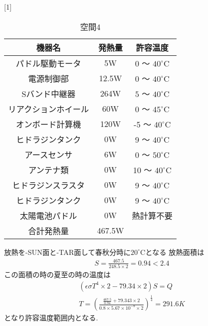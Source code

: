 \begin{table}[H]
  \begin{center}
  \caption{空間4}
  \scalebox{1}[1]{
  \begin{tabular}{|c|c|c|} \hline
    機器名 &  発熱量 & 許容温度 \\ \hline

  パドル駆動モータ
  & 5W
  & 0 〜 ${40}^\circ\mathrm{C}$\\

  電源制御部
  & 12.5W
  & 0 〜 ${40}^\circ\mathrm{C}$\\

  Sバンド中継器
  & 264W
  & $5$ 〜 ${40}^\circ\mathrm{C}$\\

  リアクションホイール
  & 60W
  & 0 〜 ${45}^\circ\mathrm{C}$\\

  オンボード計算機
  & 120W
  & -5 〜 ${40}^\circ\mathrm{C}$\\

  ヒドラジンタンク
  & 0W
  & 9 〜 ${40}^\circ\mathrm{C}$\\

  アースセンサ
  & 6W
  & 0 〜 ${50}^\circ\mathrm{C}$\\

  アンテナ類
  & 0W
  & 10 〜 ${40}^\circ\mathrm{C}$\\

  ヒドラジンスラスタ
  & 0W
  & 9 〜 ${40}^\circ\mathrm{C}$\\

  ヒドラジンタンク
  & 0W
  & 9 〜 ${40}^\circ\mathrm{C}$\\

  太陽電池パドル
  & 0W
  &  熱計算不要\\ \hline

  合計発熱量
  & 467.5W
  & \\\hline
  \end{tabular}
  }
\end{center}
\end{table}
放熱を-SUN面と-TAR面して春秋分時に${20}^\circ\mathrm{C}$となる
放熱面積は
\begin{eqnarray}
  S=\frac{467.5}{248.5\times2}=0.94<2.4
\end{eqnarray}
この面積の時の夏至の時の温度は
\begin{eqnarray}
  (\epsilon\sigma T^4\times2 -79.34\times2)S=Q\\
  T =(\frac{\frac{467.5}{0.94}+79.343\times2}
  {0.8\times5.67\times10^{-8}\times2})^{\frac{1}{4}}=291.6K
\end{eqnarray}
となり許容温度範囲内となる.

